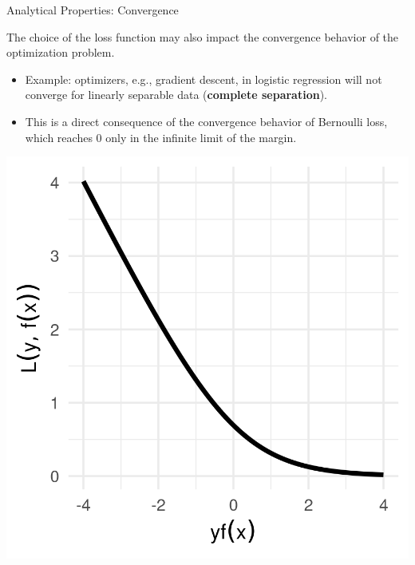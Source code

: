 
\begin{vbframe}{Analytical Properties: Convergence}

\small
The choice of the loss function may also impact the convergence behavior of the 
optimization problem. 

\vspace{0.2cm}

\begin{minipage}[b]{0.7\textwidth}
  \begin{itemize} 
    \small
    \item Example: optimizers, e.g., gradient descent, in logistic regression 
    will not converge for 
    linearly separable data (\textbf{complete separation}). 
    \item This is a direct consequence of the convergence behavior of Bernoulli 
    loss, which reaches 0 only in the infinite limit of the margin.
  \end{itemize}  
\end{minipage}%
\begin{minipage}[b]{0.05\textwidth}
  \phantom{foo}
\end{minipage}%
\begin{minipage}[b]{0.25\textwidth}
  \includegraphics[width=\textwidth]{figure/plot_bernoulli}
\end{minipage}%


\end{vbframe}
